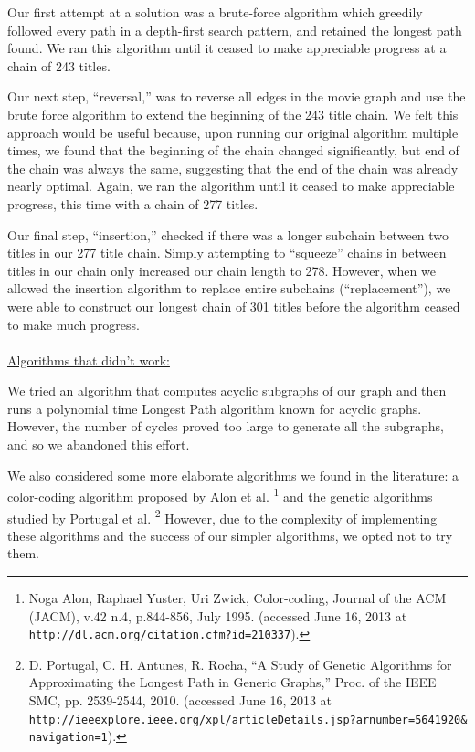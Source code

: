 \documentclass[11pt,english]{article}
\begin{document}
Our first attempt at a solution was a brute-force algorithm which greedily
followed every path in a depth-first search pattern, and retained the longest
path found. We ran this algorithm until it ceased to make appreciable progress
at a chain of 243 titles.

Our next step, ``reversal,'' was to reverse all edges in the movie graph and
use the brute force algorithm to extend the beginning of the 243 title chain.
We felt this approach would be useful because, upon running our original
algorithm multiple times, we found that the beginning of the chain changed
significantly, but end of the chain was always the same, suggesting that
the end of the chain was already nearly optimal. Again, we ran the algorithm
until it ceased to make appreciable progress, this time with a chain of 277
titles.

Our final step, ``insertion,'' checked if there was a longer subchain between
two titles in our 277 title chain. Simply attempting to ``squeeze'' chains in
between titles in our chain only increased our chain length to 278. However,
when we allowed the insertion algorithm to replace entire subchains
(``replacement''), we were able to construct our longest chain of 301 titles
before the algorithm ceased to make much progress.\\\\
\underline{Algorithms that didn't work:}

We tried an algorithm that computes acyclic subgraphs of our graph and then
runs a polynomial time Longest Path algorithm known for acyclic graphs.
However, the number of cycles proved too large to generate all the subgraphs,
and so we abandoned this effort.

We also considered some more elaborate algorithms we found in the literature:
a color-coding algorithm proposed by Alon et al.\hspace{-0.2cm}
\footnote{Noga Alon, Raphael Yuster, Uri Zwick, Color-coding, Journal of the
ACM (JACM), v.42 n.4, p.844-856, July 1995. (accessed June 16, 2013 at
\texttt{http://dl.acm.org/citation.cfm?id=210337}).}
and the genetic algorithms studied by Portugal et al.\hspace{-0.2cm}
\footnote{
D. Portugal, C. H. Antunes, R. Rocha, ``A Study of Genetic Algorithms for
Approximating the Longest Path in Generic Graphs,'' Proc. of the IEEE SMC, pp.
2539-2544, 2010. (accessed June 16, 2013 at
\texttt{http://ieeexplore.ieee.org/xpl/articleDetails.jsp?arnumber=5641920\&
navigation=1}).}
However, due to the complexity of implementing these algorithms and the success
of our simpler algorithms, we opted not to try them.
\end{document}
